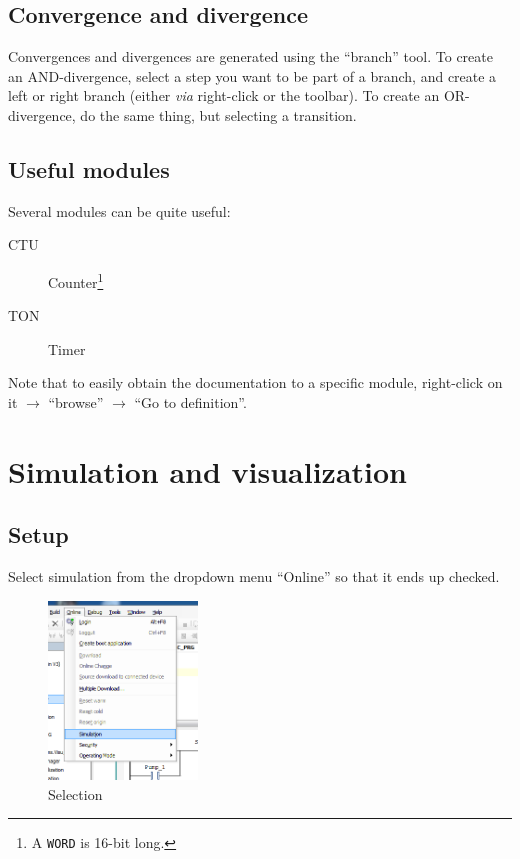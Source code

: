 \documentclass[10pt,a4paper]{article}
\begin{document}
\subsection{Convergence and divergence}
Convergences and divergences are generated using the ``branch'' tool.
To create an AND-divergence, select a step you want to be part of a branch, and create a left or right branch (either \textit{via} right-click or the toolbar).
To create an OR-divergence, do the same thing, but selecting a transition.

\subsection{Useful modules}
Several modules can be quite useful:
\begin{description}
  \item[CTU] Counter\footnote{A \texttt{WORD} is 16-bit long.}
  \item[TON] Timer
\end{description}

Note that to easily obtain the documentation to a specific module, right-click on it $\rightarrow$ ``browse'' $\rightarrow$ ``Go to definition''.





\section{Simulation and visualization}
\subsection{Setup}
Select simulation from the dropdown menu ``Online'' so that it ends up checked.

\begin{figure}[h!]
	\begin{center}
		\includegraphics[width=150px]{img9.png}
	\end{center}
\caption{Selection}
\label{fig:simu}
\end{figure}
\end{document}
